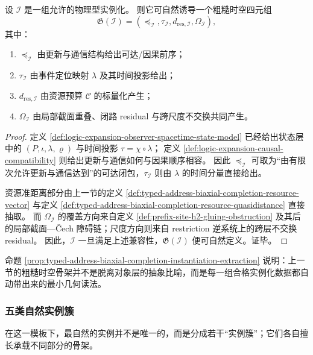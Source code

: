 \begin{proposition}[实例化到粗糙时空骨架的抽取]\label{prop:typed-address-biaxial-completion-instantiation-extraction}
设 \(\mathcal I\) 是一组允许的物理型实例化。
则它可自然诱导一个粗糙时空四元组
\[
\mathfrak G(\mathcal I)
=
(\preceq_{\mathcal I},\tau_{\mathcal I},d_{\mathrm{res},\mathcal I},\Omega_{\mathcal I}),
\]
其中：
\begin{enumerate}
  \item \(\preceq_{\mathcal I}\) 由更新与通信结构给出可达/因果前序；
  \item \(\tau_{\mathcal I}\) 由事件定位映射 \(\lambda\) 及其时间投影给出；
  \item \(d_{\mathrm{res},\mathcal I}\) 由资源预算 \(\mathcal C\) 的标量化产生；
  \item \(\Omega_{\mathcal I}\) 由局部截面重叠、闭路 residual 与跨尺度不交换共同产生。
\end{enumerate}
\end{proposition}

\begin{proof}
定义 \ref{def:logic-expansion-observer-spacetime-state-model} 已经给出状态层中的 \((P,\iota,\lambda,\varrho)\) 与时间投影 \(\tau=\chi\circ\lambda\)；
定义 \ref{def:logic-expansion-causal-compatibility} 则给出更新与通信如何与因果顺序相容。
因此 \(\preceq_{\mathcal I}\) 可取为“由有限次允许更新与通信达到”的可达闭包，\(\tau_{\mathcal I}\) 则由 \(\lambda\) 的时间分量直接给出。

资源准距离部分由上一节的定义 \ref{def:typed-address-biaxial-completion-resource-vector} 与定义 \ref{def:typed-address-biaxial-completion-resource-quasidistance} 直接抽取。
而 \(\Omega_{\mathcal I}\) 的覆盖方向来自定义 \ref{def:prefix-site-h2-gluing-obstruction} 及其后的局部截面—Čech 障碍链；尺度方向则来自 restriction 逆系统上的跨层不交换 residual。
因此，\(\mathcal I\) 一旦满足上述兼容性，\(\mathfrak G(\mathcal I)\) 便可自然定义。证毕。
\end{proof}

命题 \ref{prop:typed-address-biaxial-completion-instantiation-extraction} 说明：上一节的粗糙时空骨架并不是脱离对象层的抽象比喻，而是每一组合格实例化数据都自动带出来的最小几何读法。

\subsubsection{五类自然实例簇}\label{subsubsec:typed-address-biaxial-completion-five-instantiation-clusters}
在这一模板下，最自然的实例并不是唯一的，而是分成若干“实例簇”；它们各自擅长承载不同部分的骨架。

